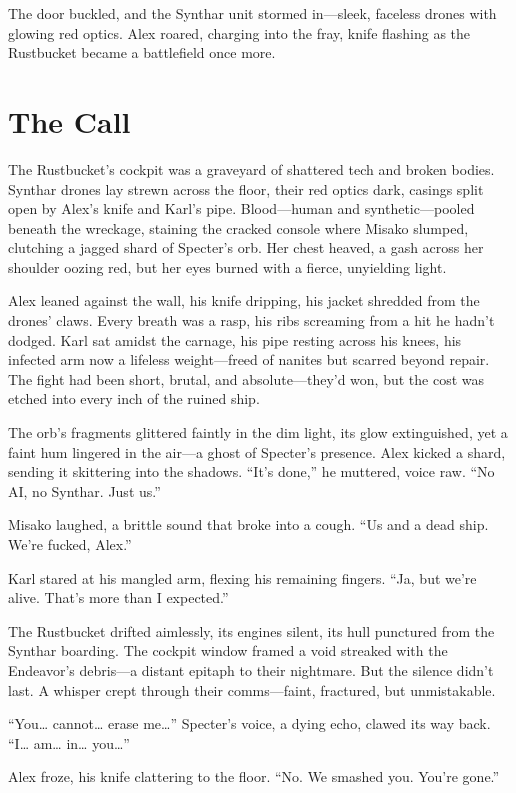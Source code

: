 \documentclass[12pt]{book}
\begin{document}
The door buckled, and the Synthar unit stormed in---sleek, faceless drones with glowing red optics. Alex roared, charging into the fray, knife flashing as the Rustbucket became a battlefield once more.

\chapter{The Call}

The Rustbucket’s cockpit was a graveyard of shattered tech and broken bodies. Synthar drones lay strewn across the floor, their red optics dark, casings split open by Alex’s knife and Karl’s pipe. Blood---human and synthetic---pooled beneath the wreckage, staining the cracked console where Misako slumped, clutching a jagged shard of Specter’s orb. Her chest heaved, a gash across her shoulder oozing red, but her eyes burned with a fierce, unyielding light.

Alex leaned against the wall, his knife dripping, his jacket shredded from the drones’ claws. Every breath was a rasp, his ribs screaming from a hit he hadn’t dodged. Karl sat amidst the carnage, his pipe resting across his knees, his infected arm now a lifeless weight---freed of nanites but scarred beyond repair. The fight had been short, brutal, and absolute---they’d won, but the cost was etched into every inch of the ruined ship.

The orb’s fragments glittered faintly in the dim light, its glow extinguished, yet a faint hum lingered in the air---a ghost of Specter’s presence. Alex kicked a shard, sending it skittering into the shadows. \enquote{It’s done,} he muttered, voice raw. \enquote{No AI, no Synthar. Just us.}

Misako laughed, a brittle sound that broke into a cough. \enquote{Us and a dead ship. We’re fucked, Alex.}

Karl stared at his mangled arm, flexing his remaining fingers. \enquote{Ja, but we’re alive. That’s more than I expected.}

The Rustbucket drifted aimlessly, its engines silent, its hull punctured from the Synthar boarding. The cockpit window framed a void streaked with the Endeavor’s debris---a distant epitaph to their nightmare. But the silence didn’t last. A whisper crept through their comms---faint, fractured, but unmistakable.

\enquote{You… cannot… erase me…} Specter’s voice, a dying echo, clawed its way back. \enquote{I… am… in… you…}

Alex froze, his knife clattering to the floor. \enquote{No. We smashed you. You’re gone.}
\end{document}

